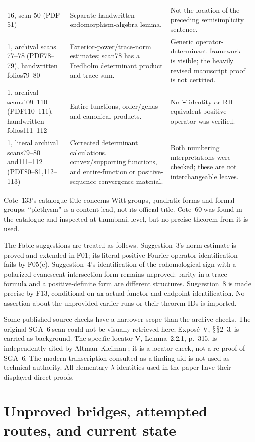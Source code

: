 \documentclass[11pt,a4paper]{article}
\renewcommand{\S}{\ensuremath{\mathsection}}
\newcommand{\fid}[1]{\textsf{#1}}\newcommand{\gate}[1]{\textsf{#1}}
\theoremstyle{named}\newtheorem{finding}{Finding}[section]
\theoremstyle{definition}\newtheorem{definition}[finding]{Definition}
\theoremstyle{remark}\newtheorem{remark}[finding]{Remark}
\begin{document}
{\begin{longtable}{p{.19\linewidth}p{.36\linewidth}p{.37\linewidth}}
16, scan 50 (PDF 51)&Separate handwritten endomorphism-algebra lemma.&Not the location of the preceding semisimplicity sentence.\\
1, archival scans 77--78 (PDF78--79), handwritten folios79--80&Exterior-power/trace-norm estimates; scan78 has a Fredholm determinant product and trace sum.&Generic operator-determinant framework is visible; the heavily revised manuscript proof is not certified.\\
1, archival scans109--110 (PDF110--111), handwritten folios111--112&Entire functions, order/genus and canonical products.&No $\Xi$ identity or RH-equivalent positive operator was verified.\\
1, literal archival scans79--80 and111--112 (PDF80--81,112--113)&Corrected determinant calculations, convex/supporting functions, and entire-function or positive-sequence convergence material.&Both numbering interpretations were checked; these are not interchangeable leaves.\\\bottomrule
\end{longtable}}
Cote~133's catalogue title concerns Witt groups, quadratic forms and formal groups; ``plethysm'' is a content lead, not its official title. Cote~60 was found in the catalogue and inspected at thumbnail level, but no precise theorem from it is used.

The Fable suggestions are treated as follows. Suggestion~3's norm estimate is proved and extended in \fid{F01}; its literal positive-Fourier-operator identification fails by \fid{F05}(e). Suggestion~4's identification of the cohomological sign with a polarized evanescent intersection form remains unproved: parity in a trace formula and a positive-definite form are different structures. Suggestion~8 is made precise by \fid{F13}, conditional on an actual functor and endpoint identification. No assertion about the unprovided earlier runs or their theorem IDs is imported.

Some published-source checks have a narrower scope than the archive checks. The original SGA~6 scan could not be visually retrieved here; Expos\'e~V, \S\S2--3, is carried as background. The specific locator V, Lemma~2.2.1, p.~315, is independently cited by Altman--Kleiman \cite[\S2.10]{AK}; it is a locator check, not a re-proof of SGA~6. The modern transcription consulted as a finding aid is not used as technical authority. All elementary $\lambda$ identities used in the paper have their displayed direct proofs.

\part{Unproved bridges, attempted routes, and current state}
\end{document}
